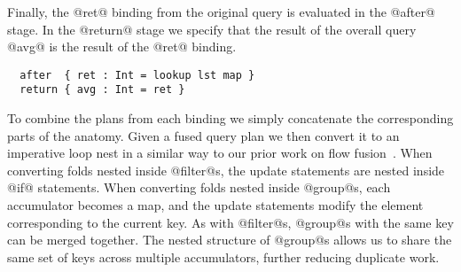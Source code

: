
Finally, the @ret@ binding from the original query is evaluated in the @after@ stage. In the @return@ stage we specify that the result of the overall query @avg@ is the result of the @ret@ binding.
\begin{lstlisting}
  after  { ret : Int = lookup lst map }
  return { avg : Int = ret }
\end{lstlisting}


To combine the plans from each binding we simply concatenate the corresponding parts of the anatomy.
Given a fused query plan we then convert it to an imperative loop nest in a similar way to our prior work on flow fusion~\cite{lippmeier2013data}.
When converting folds nested inside @filter@s, the update statements are nested inside @if@ statements.
When converting folds nested inside @group@s, each accumulator becomes a map, and the update statements modify the element corresponding to the current key.
As with @filter@s, @group@s with the same key can be merged together.
The nested structure of @group@s allows us to share the same set of keys across multiple accumulators, further reducing duplicate work.

